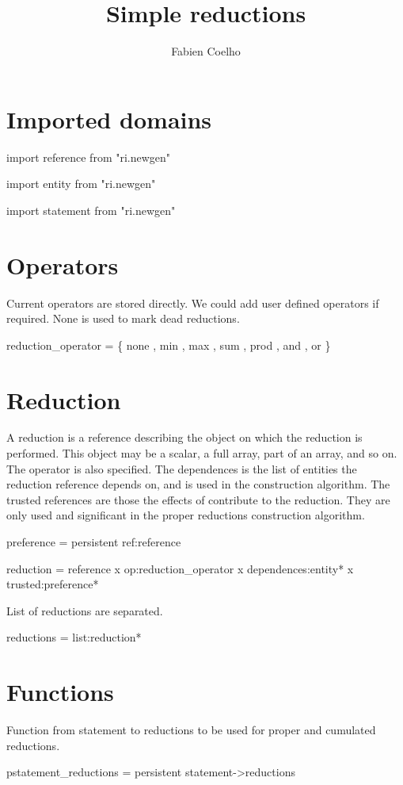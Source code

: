 \documentclass{article}
\title{Simple reductions}
\author{Fabien Coelho}
\newcommand{\domain}[1]{\par{#1}}
\begin{document}
\maketitle

\section{Imported domains}
\label{sec:import}

\domain{import reference from "ri.newgen"}
\domain{import entity from "ri.newgen"}
\domain{import statement from "ri.newgen"}

\section{Operators}
\label{sec:operators}

Current operators are stored directly.
We could add user defined operators if required.
None is used to mark dead reductions. 

\domain{reduction\_operator = \{ none , min , max , sum , prod , and , or \}}


\section{Reduction}
\label{sec:reduction}

A reduction is a reference describing the object on which the reduction is
performed. This object may be a scalar, a full array, part of an array,
and so on. The operator is also specified. The dependences is the list of
entities the reduction reference depends on, and is used in the
construction algorithm. The trusted references are those the effects of
contribute to the reduction. They are only used and significant in the
proper reductions construction algorithm.

\domain{preference = persistent ref:reference}

\domain{reduction = reference x op:reduction\_operator x dependences:entity* x trusted:preference*}

List of reductions are separated.

\domain{reductions = list:reduction*}


\section{Functions}
\label{sec:functions}

Function from statement to reductions to be used for proper and cumulated
reductions. 

\domain{pstatement\_reductions = persistent statement->reductions}
\end{document}

